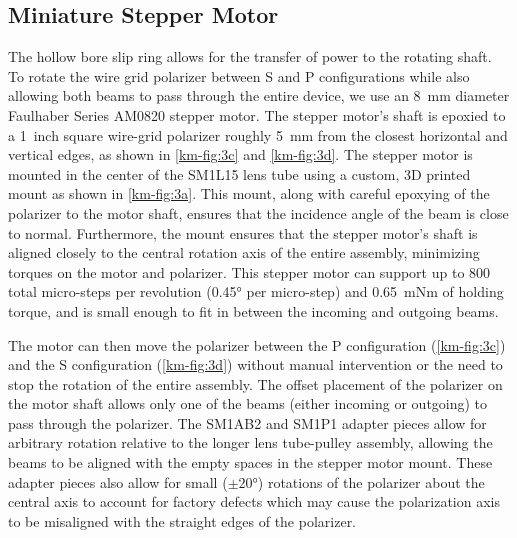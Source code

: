 \subsection{Miniature Stepper Motor}
\label{km-sec:stepper}
The hollow bore slip ring allows for the transfer of power to the rotating shaft.
To rotate the wire grid polarizer between S and P configurations while also allowing both beams to pass through the entire device, we use an \qty{8}{mm} diameter Faulhaber Series AM0820 stepper motor.
The stepper motor's shaft is epoxied to a \qty{1}{inch} square wire-grid polarizer roughly \qty{5}{mm} from the closest horizontal and vertical edges, as shown in \cref{km-fig:3c} and \cref{km-fig:3d}.
The stepper motor is mounted in the center of the SM1L15 lens tube using a custom, 3D printed mount as shown in \cref{km-fig:3a}. 
This mount, along with careful epoxying of the polarizer to the motor shaft, ensures that the incidence angle of the beam is close to normal.
Furthermore, the mount ensures that the stepper motor's shaft is aligned closely to the central rotation axis of the entire assembly, minimizing torques on the motor and polarizer.
This stepper motor can support up to \num{800} total micro-steps per revolution (\ang{0.45} per micro-step) and \qty{0.65}{mNm} of holding torque, and is small enough to fit in between the incoming and outgoing beams. 

The motor can then move the polarizer between the P configuration (\cref{km-fig:3c}) and the S configuration (\cref{km-fig:3d}) without manual intervention or the need to stop the rotation of the entire assembly.
The offset placement of the polarizer on the motor shaft allows only one of the beams (either incoming or outgoing) to pass through the polarizer.
The SM1AB2 and SM1P1 adapter pieces allow for arbitrary rotation relative to the longer lens tube-pulley assembly, allowing the beams to be aligned with the empty spaces in the stepper motor mount.
These adapter pieces also allow for small ($\pm \ang{20}$) rotations of the polarizer about the central axis to account for factory defects which may cause the polarization axis to be misaligned with the straight edges of the polarizer.

